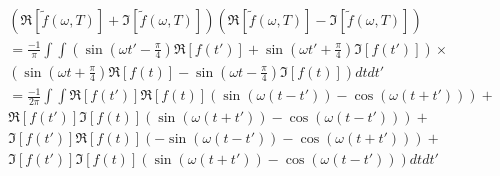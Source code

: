 \begin{align}
   \left( \Re \left[ \tilde{f}(\omega, T)  \right] + \Im \left[ \tilde{f}(\omega, T)  \right] \right) \left( \Re \left[ \tilde{f} (\omega, T)  \right] - \Im \left[ \tilde{f} (\omega, T)  \right] \right) \\
   =\frac{-1}{\pi} \int \int \left( \sin \left(  \omega t' - \frac{\pi }{4} \right) \Re\left[ f(t') \right]  + \sin \left(  \omega t' + \frac{\pi }{4} \right) \Im \left[f(t')\right] \right)  \times \\
   \left( \sin \left(  \omega t + \frac{\pi }{4} \right) \Re\left[ f(t) \right]  - \sin \left(  \omega t - \frac{\pi }{4} \right) \Im \left[f(t)\right] \right) dt dt'\\
   =\frac{-1}{2\pi} \int \int \Re\left[ f(t') \right]  \Re\left[ f(t) \right]  \left(  \sin (\omega (t - t')) -  \cos (\omega (t + t')) \right)    + \\
   \Re\left[ f(t') \right]  \Im\left[ f(t) \right]   \left(  \sin (\omega (t + t')) -  \cos (\omega (t - t')) \right)      + \\
   \Im\left[ f(t') \right]  \Re\left[ f(t) \right]   \left( - \sin (\omega (t - t')) -  \cos (\omega (t + t')) \right)      + \\
   \Im\left[ f(t') \right]  \Im\left[ f(t) \right]   \left(  \sin (\omega (t + t')) -  \cos (\omega (t - t')) \right)   dt dt'
\end{align}

